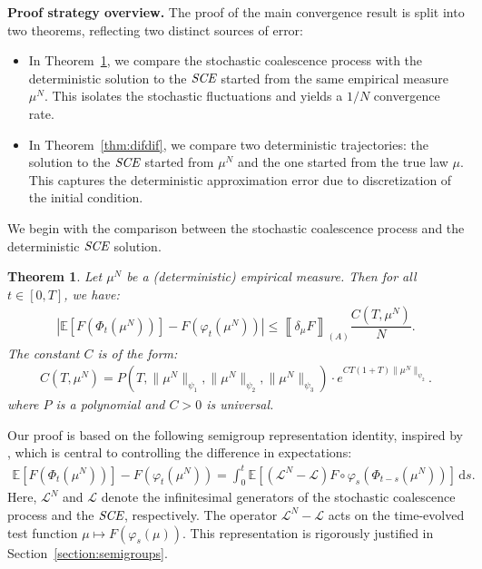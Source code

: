 \documentclass[11pt,a4paper]{article}
\newcommand{\LC}{\mathcal{L}}
\newcommand{\SCE}{\emph{SCE}}
\newcommand{\A}{(A)}
\newtheorem{theorem}{Theorem}[section]
\begin{document}
\textbf{Proof strategy overview.} The proof of the main convergence result is split into two theorems, reflecting two distinct sources of error:

\begin{itemize}
    \item In Theorem~\ref{thm:samesame}, we compare the stochastic coalescence process with the deterministic solution to the $\SCE$ started from the same empirical measure $\mu^N$. This isolates the stochastic fluctuations and yields a $1/N$ convergence rate.
    \item In Theorem~\ref{thm:difdif}, we compare two deterministic trajectories: the solution to the $\SCE$ started from $\mu^N$ and the one started from the true law $\mu$. This captures the deterministic approximation error due to discretization of the initial condition.
\end{itemize}

We begin with the comparison between the stochastic coalescence process and the deterministic $\SCE$ solution.

\begin{theorem}\label{thm:samesame}
    Let $\mu^N$ be a (deterministic) empirical measure. Then for all $t \in [0,T]$, we have:
    \begin{align*}
        \left| \mathbb{E}\left[F\left(\Phi_t(\mu^N)\right)\right] - F\left(\varphi_t(\mu^N)\right) \right| 
        \leq \left\llbracket \delta_\mu F \right\rrbracket_{\A} \dfrac{C(T,\mu^N)}{N}.
    \end{align*}
    The constant $C$ is of the form:
    \begin{align*}
        C(T,\mu^N) = P\left(T,\|\mu^N\|_{\psi_1},\|\mu^N\|_{\psi_2},\|\mu^N\|_{\psi_3}\right) 
        \cdot e^{CT(1 + T)\|\mu^N\|_{\psi_2}}.
    \end{align*}
    where $P$ is a polynomial and $C > 0$ is universal.
\end{theorem}

Our proof is based on the following semigroup representation identity, inspired by \cite{kolokoltsov2010central}, which is central to controlling the difference in expectations:
\begin{align}\label{eq:semi-group-relation}
    \mathbb{E}\left[F(\Phi_t(\mu^N))\right] - F(\varphi_t(\mu^N)) 
    = \int_0^t \mathbb{E}\left[\left(\LC^N - \LC\right)F\circ \varphi_s\left(\Phi_{t-s}(\mu^N)\right)\right]\, \mathrm{d}s.
\end{align}
Here, $\LC^N$ and $\LC$ denote the infinitesimal generators of the stochastic coalescence process and the $\SCE$, respectively. The operator $\LC^N - \LC$ acts on the time-evolved test function $\mu \mapsto F(\varphi_s(\mu))$. This representation is rigorously justified in Section~\ref{section:semigroups}.
\end{document}
